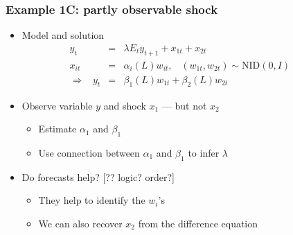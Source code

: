 \documentclass{beamer}
\begin{document}
\begin{frame}
\frametitle{Example 1C: partly observable shock}
\begin{itemize}  \itemsep=\bigskipamount
\item Model and solution
\begin{eqnarray*}
    y_t &=& \lambda E_t y_{t+1} + x_{1t} + x_{2t} \\
    x_{it} &=& \alpha_{i}(L) w_{it}, \;\;\; (w_{1t},w_{2t}) \sim \mbox{NID}(0,I)
                \phantom{xxx} \\
    \Rightarrow \;\;\;
    y_t &=&  \beta_1(L) w_{1t} + \beta_2(L) w_{2t}
\end{eqnarray*}
\item Observe variable $y$ and shock $x_1$ --- but not $x_2$ \\
\begin{itemize}
\item Estimate $\alpha_{1}$ and $\beta_{1}$
\item Use connection between $\alpha_1$ and $\beta_1$ to infer $\lambda$
\end{itemize}
\item Do forecasts help? [?? logic? order?] \\
\begin{itemize}
\item They help to identify the $w_i$'s
\item We can also recover $x_2$ from the difference equation 
\end{itemize}
\end{itemize}
\end{frame}
\end{document}
